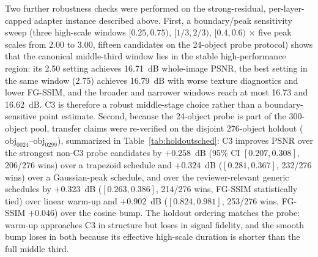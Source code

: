 \documentclass[times,twocolumn,final]{elsarticle}
\providecommand{\DIFadd}[1]{{\protect\color{blue} \sf #1}} %
\providecommand{\DIFaddend}{} %
\DeclareRobustCommand{\DIFaddend}{\DIFOaddend \let\includegraphics\DIFOincludegraphics} %
\begin{document}
\DIFadd{Two further robustness checks were performed on the strong-residual, per-layer-capped adapter instance described above. First, a boundary/peak sensitivity sweep (three high-scale windows $[0.25,0.75)$, $[1/3,2/3)$, $[0.4,0.6)$ $\times$ five peak scales from 2.00 to 3.00, fifteen candidates on the 24-object probe protocol) shows that the canonical middle-third window lies in the stable high-performance region: its 2.50 setting achieves 16.71~dB whole-image PSNR, the best setting in the same window (2.75) achieves 16.79~dB with worse texture diagnostics and lower FG-SSIM, and the broader and narrower windows reach at most 16.73 and 16.62~dB. C3 is therefore a robust middle-stage choice rather than a boundary-sensitive point estimate. Second, because the 24-object probe is part of the 300-object pool, transfer claims were re-verified on the disjoint 276-object holdout ($\mathrm{obj}_{0024}$--$\mathrm{obj}_{0299}$), summarized in Table~\ref{tab:holdoutsched}: C3 improves PSNR over the strongest non-C3 probe candidates by $+0.258$~dB (95\% CI $[0.207,0.308]$, 206/276 wins) over a trapezoid schedule and $+0.324$~dB ($[0.281,0.367]$, 232/276 wins) over a Gaussian-peak schedule, and over the reviewer-relevant generic schedules by $+0.323$~dB ($[0.263,0.386]$, 214/276 wins, FG-SSIM statistically tied) over linear warm-up and $+0.902$~dB ($[0.824,0.981]$, 253/276 wins, FG-SSIM $+0.046$) over the cosine bump. The holdout ordering matches the probe: warm-up approaches C3 in structure but loses in signal fidelity, and the smooth bump loses in both because its effective high-scale duration is shorter than the full middle third}\DIFaddend .
\end{document}
